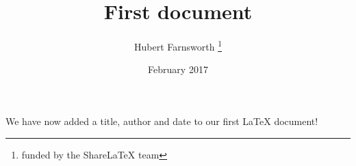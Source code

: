 \documentclass[12pt, letterpaper, twoside]{article}
\title{First document}
\author{Hubert Farnsworth \thanks{funded by the ShareLaTeX team}}
\date{February 2017}
\begin{document}
 
\maketitle

We have now added a title, author and date to our first \LaTeX{} document!
 
\end{document}
